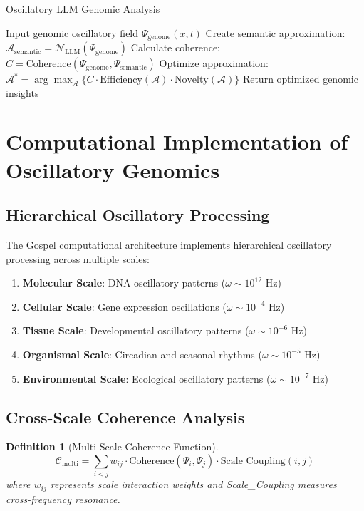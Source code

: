 \documentclass[12pt,a4paper]{article}
\newtheorem{definition}[theorem]{Definition}
\begin{document}
\begin{algorithm}[H]
\caption{Oscillatory LLM Genomic Analysis}
\begin{algorithmic}[1]
\State Input genomic oscillatory field $\Psi_{\text{genome}}(x,t)$
\State Create semantic approximation: $\mathcal{A}_{\text{semantic}} = \mathcal{N}_{\text{LLM}}(\Psi_{\text{genome}})$
\State Calculate coherence: $C = \text{Coherence}(\Psi_{\text{genome}}, \Psi_{\text{semantic}})$
\State Optimize approximation: $\mathcal{A}^* = \arg\max_{\mathcal{A}} \{C \cdot \text{Efficiency}(\mathcal{A}) \cdot \text{Novelty}(\mathcal{A})\}$
\State Return optimized genomic insights
\end{algorithmic}
\end{algorithm}

\section{Computational Implementation of Oscillatory Genomics}

\subsection{Hierarchical Oscillatory Processing}

The Gospel computational architecture implements hierarchical oscillatory processing across multiple scales:

\begin{enumerate}
\item \textbf{Molecular Scale}: DNA oscillatory patterns ($\omega \sim 10^{12}$ Hz)
\item \textbf{Cellular Scale}: Gene expression oscillations ($\omega \sim 10^{-4}$ Hz)  
\item \textbf{Tissue Scale}: Developmental oscillatory patterns ($\omega \sim 10^{-6}$ Hz)
\item \textbf{Organismal Scale}: Circadian and seasonal rhythms ($\omega \sim 10^{-5}$ Hz)
\item \textbf{Environmental Scale}: Ecological oscillatory patterns ($\omega \sim 10^{-7}$ Hz)
\end{enumerate}

\subsection{Cross-Scale Coherence Analysis}

\begin{definition}[Multi-Scale Coherence Function]
$$\mathcal{C}_{\text{multi}} = \sum_{i<j} w_{ij} \cdot \text{Coherence}(\Psi_i, \Psi_j) \cdot \text{Scale\_Coupling}(i,j)$$
where $w_{ij}$ represents scale interaction weights and Scale\_Coupling measures cross-frequency resonance.
\end{definition}
\end{document}
